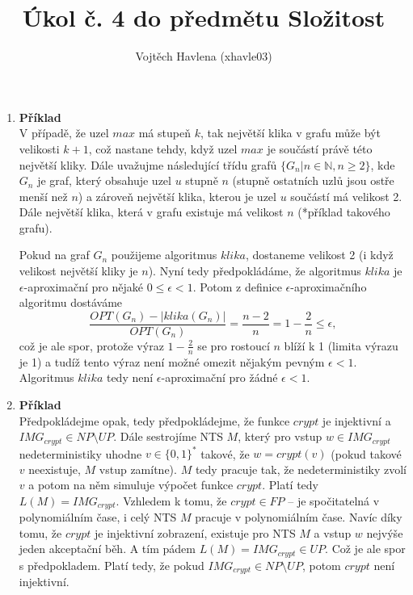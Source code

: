 \documentclass[a4paper,12pt]{article}
\title{Úkol č. 4 do předmětu Složitost}
\author{Vojtěch Havlena (xhavle03)}
\date{}
\begin{document}
\maketitle


\begin{enumerate}[label=\textbf{\arabic*}.]

 \item {\bfseries Příklad}\\
  V případě, že uzel $max$ má stupeň $k$, tak největší klika v grafu může být velikosti $k+1$, což nastane
  tehdy, když uzel $max$ je součástí právě této největší kliky. Dále uvažujme následující třídu grafů 
  $\{G_n | n\in\mathbb{N}, n \geq 2\}$, kde $G_n$ je graf, který obsahuje uzel $u$ stupně $n$ (stupně 
  ostatních uzlů jsou ostře menší než $n$) a zároveň největší klika, kterou je uzel $u$ součástí má velikost 2. 
  Dále největší klika, která v grafu existuje má velikost $n$ (*příklad takového grafu). 
  
  Pokud na graf $G_n$ použijeme algoritmus $klika$, dostaneme velikost 2 (i když velikost největší kliky je $n$).
  Nyní tedy předpokládáme, že algoritmus $klika$ je $\epsilon$-aproximační pro nějaké $0 \leq \epsilon < 1$.
  Potom z definice $\epsilon$-aproximačního algoritmu dostáváme
  $$
    \frac{OPT(G_n) - |klika(G_n)|}{OPT(G_n)} = \frac{n - 2}{n} = 1 - \frac{2}{n} \leq \epsilon,
  $$
  což je ale spor, protože výraz $1 - \frac{2}{n}$ se pro rostoucí $n$ blíží k 1 (limita výrazu je 1) a 
  tudíž tento výraz není možné omezit nějakým pevným $\epsilon < 1$. Algoritmus $klika$ tedy není $\epsilon$-aproximační
  pro žádné $\epsilon < 1$.
  
 \item {\bfseries Příklad}\\
  Předpokládejme opak, tedy předpokládejme, že funkce $crypt$ je injektivní a $IMG_{crypt} \in NP\setminus UP$. Dále sestrojíme NTS $M$, který pro
  vstup $w \in IMG_{crypt}$ nedeterministiky uhodne $v \in \{0,1\}^*$ takové, že $w = crypt(v)$ (pokud takové $v$
  neexistuje, $M$ vstup zamítne). $M$ tedy pracuje tak, že nedeterministiky zvolí $v$ a potom na něm simuluje výpočet funkce $crypt$. 
  Platí tedy $L(M) = IMG_{crypt}$. Vzhledem k tomu, že $crypt \in FP$ -- je spočitatelná
  v polynomiálním čase, i celý NTS $M$ pracuje v polynomiálním čase. Navíc díky tomu, že $crypt$ je injektivní zobrazení,
  existuje pro NTS $M$ a vstup $w$ nejvýše jeden akceptační běh. A tím pádem $L(M) = IMG_{crypt} \in UP$.
  Což je ale spor s předpokladem. Platí tedy, že pokud $IMG_{crypt} \in NP\setminus UP$, potom $crypt$ není injektivní.
  

\end{enumerate}
\end{document}
